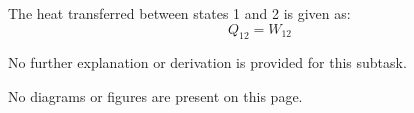 The heat transferred between states 1 and 2 is given as:  
\[
Q_{12} = W_{12}
\]  

No further explanation or derivation is provided for this subtask.  

No diagrams or figures are present on this page.